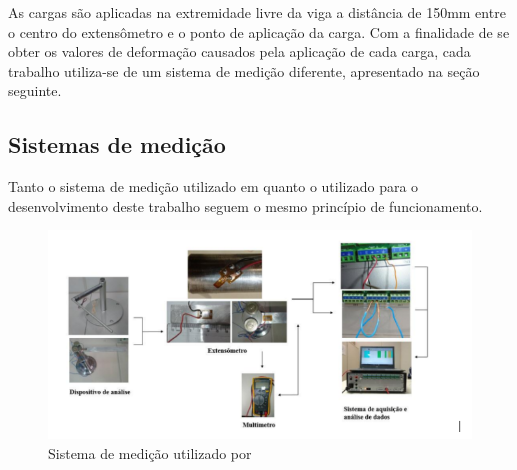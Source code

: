 \begin{table}[htb]
\caption[]{Propriedades do extensômetro colado ao dispositivo de flexão}
\label{tab:PropriedadesExtensometro}
\end{table}

As cargas são aplicadas na extremidade livre da viga a distância de 150mm entre o centro do extensômetro e o ponto de aplicação da carga.
Com a finalidade de se obter os valores de deformação causados pela aplicação de cada carga, cada trabalho utiliza-se de um sistema de medição diferente, apresentado
na seção seguinte.

\subsection{Sistemas de medição}

Tanto o sistema de medição utilizado em \autocite{Minela2017} quanto o utilizado para o desenvolvimento deste trabalho seguem o mesmo princípio de funcionamento.

\begin{figure}[htb]
	\caption{\label{fig:2050} Sistema de medição utilizado por \autocite{Minela2017}}
	\begin{center}
		\includegraphics[width=\textwidth]{pictures/2050.png}
	\end{center}
\end{figure}


